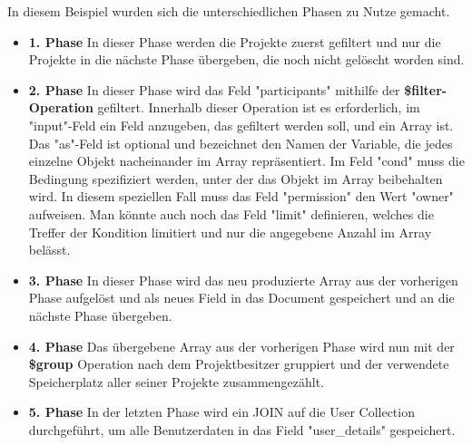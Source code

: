 In diesem Beispiel wurden sich die unterschiedlichen Phasen zu Nutze gemacht.
\begin{itemize}
    \item \textbf{1. Phase}
        \newline
        In dieser Phase werden die Projekte zuerst gefiltert und nur die Projekte in die nächste Phase übergeben, die noch nicht gelöscht worden sind.
    \item \textbf{2. Phase}
        \newline
        In dieser Phase wird das Feld "participants" mithilfe der \textbf{\$filter-Operation} gefiltert. Innerhalb dieser Operation ist es erforderlich, im "input"-Feld ein Feld anzugeben, das gefiltert werden soll, und ein Array ist. Das "as"-Feld ist optional und bezeichnet den Namen der Variable, die jedes einzelne Objekt nacheinander im Array repräsentiert. Im Feld "cond" muss die Bedingung spezifiziert werden, unter der das Objekt im Array beibehalten wird. In diesem speziellen Fall muss das Feld "permission" den Wert "owner" aufweisen. Man könnte auch noch das Feld "limit" definieren, welches die Treffer der Kondition limitiert und nur die angegebene Anzahl im Array belässt.
    \item \textbf{3. Phase}
        \newline
        In dieser Phase wird das neu produzierte Array aus der vorherigen Phase aufgelöst und als neues Field in das Document gespeichert und an die nächste Phase übergeben.
    \item \textbf{4. Phase}
        \newline
        Das übergebene Array aus der vorherigen Phase wird nun mit der \textbf{\$group} Operation nach dem Projektbesitzer gruppiert und der verwendete Speicherplatz aller seiner Projekte zusammengezählt.
    \item \textbf{5. Phase}
        \newline
        In der letzten Phase wird ein JOIN auf die User Collection durchgeführt, um alle Benutzerdaten in das Field "user\_details" gespeichert.
\end{itemize}
\cite{mongodb_aggregation_filter}